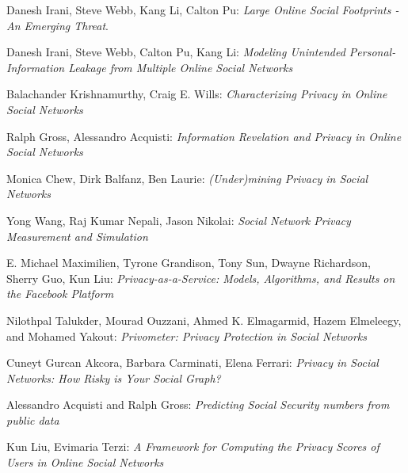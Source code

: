 \documentclass[10pt,conference]{IEEEtran}
\begin{document}
\begin{thebibliography}{1}
Danesh Irani, Steve Webb, Kang Li, Calton Pu: 
\textit{Large Online Social Footprints -An Emerging Threat}. 
 
Danesh Irani, Steve Webb, Calton Pu, Kang Li: 
\textit{Modeling Unintended Personal-Information Leakage from Multiple Online Social Networks}
 
Balachander Krishnamurthy, Craig E. Wills: 
\textit{Characterizing Privacy in Online Social Networks}

Ralph Gross, Alessandro Acquisti: 
\textit{Information Revelation and Privacy in Online Social Networks}

Monica Chew, Dirk Balfanz, Ben Laurie: 
\textit{(Under)mining Privacy in Social Networks}

Yong Wang, Raj Kumar Nepali, Jason Nikolai: 
\textit{Social Network Privacy Measurement and Simulation}

E. Michael Maximilien, Tyrone Grandison, Tony Sun, Dwayne Richardson, Sherry Guo, Kun Liu: 
\textit{Privacy-as-a-Service: Models, Algorithms, and Results on the Facebook Platform}

Nilothpal Talukder, Mourad Ouzzani, Ahmed K. Elmagarmid, Hazem Elmeleegy, and Mohamed Yakout: 
\textit{Privometer: Privacy Protection in Social Networks}

Cuneyt Gurcan Akcora, Barbara Carminati, Elena Ferrari: 
\textit{Privacy in Social Networks: How Risky is Your Social Graph?}

Alessandro Acquisti and Ralph Gross: 
\textit{Predicting Social Security numbers from public data}

Kun Liu, Evimaria Terzi: 
\textit{A Framework for Computing the Privacy Scores of Users in Online Social Networks}


\end{thebibliography}
\end{document}
